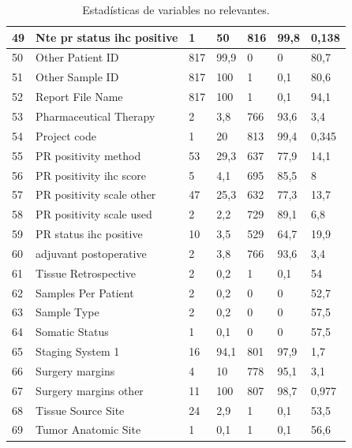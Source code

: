 \begin{table}[!htb]
\begin{threeparttable}
\begin{tabular}{p{0.5cm} p{4cm} p{1.5cm} p{2cm} p{1.5cm} p{2cm} p{1.5cm}}
			\\ \hline	49	&	Nte pr status ihc positive	&	1	&	50	&	816	&	99,8	&	0,138
			\\ \hline	50	&	Other Patient ID	&	817	&	99,9	&	0	&	0	&	80,7
			\\ \hline	51	&	Other Sample ID	&	817	&	100	&	1	&	0,1	&	80,6
			\\ \hline	52	&	Report File Name	&	817	&	100	&	1	&	0,1	&	94,1
			\\ \hline	53	&	Pharmaceutical Therapy 	&	2	&	3,8	&	766	&	93,6	&	3,4
			\\ \hline	54	&	Project code	&	1	&	20	&	813	&	99,4	&	0,345
			\\ \hline	55	&	PR positivity method	&	53	&	29,3	&	637	&	77,9	&	14,1
			\\ \hline	56	&	PR positivity ihc score	&	5	&	4,1	&	695	&	85,5	&	8
			\\ \hline	57	&	PR positivity scale other	&	47	&	25,3	&	632	&	77,3	&	13,7
			\\ \hline	58	&	PR positivity scale used	&	2	&	2,2	&	729	&	89,1	&	6,8
			\\ \hline	59	&	PR status ihc positive	&	10	&	3,5	&	529	&	64,7	&	19,9
			\\ \hline	60	&	adjuvant postoperative 	&	2	&	3,8	&	766	&	93,6	&	3,4
			\\ \hline	61	&	Tissue Retrospective 	&	2	&	0,2	&	1	&	0,1	&	54
			\\ \hline	62	&	Samples Per Patient	&	2	&	0,2	&	0	&	0	&	52,7
			\\ \hline	63	&	Sample Type	&	2	&	0,2	&	0	&	0	&	57,5
			\\ \hline	64	&	Somatic Status	&	1	&	0,1	&	0	&	0	&	57,5
			\\ \hline	65	&	Staging System 1	&	16	&	94,1	&	801	&	97,9	&	1,7
			\\ \hline	66	&	Surgery margins	&	4	&	10	&	778	&	95,1	&	3,1
			\\ \hline	67	&	Surgery margins other	&	11	&	100	&	807	&	98,7	&	0,977
			\\ \hline	68	&	Tissue Source Site	&	24	&	2,9	&	1	&	0,1	&	53,5
			\\ \hline	69	&	Tumor Anatomic Site	&	1	&	0,1	&	1	&	0,1	&	56,6
			\\ \hline
		\end{tabular}
		\caption{Estadísticas de variables no relevantes.}
		\label{data_no_relevante}
	\end{threeparttable}
\end{table}
\clearpage
